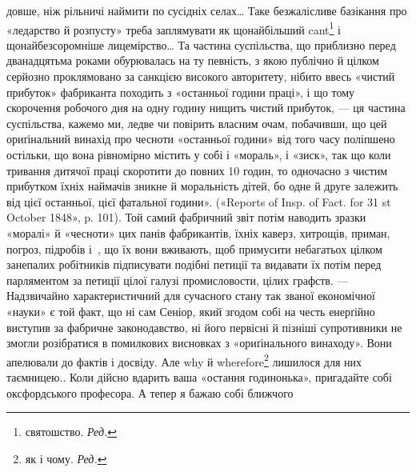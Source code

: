 {{довше, ніж рільничі наймити по сусідніх селах\dots{} Таке безжалісливе базікання
про «ледарство й розпусту» треба заплямувати як щонайбільший cant\footnote*{
святошство. \emph{Ред.}
}} і щонайбезсоромніше
лицемірство\dots{} Та частина суспільства, що приблизно перед дванадцятьма роками обурювалась на ту
певність, з якою публічно й цілком серйозно проклямовано за санкцією високого авторитету, нібито
ввесь «чистий прибуток» фабриканта походить з «останньої години праці», і що тому скорочення
робочого дня на одну
годину нищить чистий прибуток, — ця частина суспільства, кажемо ми,
ледве чи повірить власним очам, побачивши, що цей ориґінальний винахід
про чесноти «останньої години» від того часу поліпшено остільки, що вона
рівномірно містить у собі і «мораль», і «зиск», так що коли тривання дитячої праці скоротити до
повних 10 годин, то одночасно з чистим прибутком їхніх наймачів зникне й моральність дітей, бо одне
й друге залежить від цієї останньої, цієї фатальної години». («Reports of Insp. of Fact. for 31 st
October 1848», p. 101). Той самий фабричний звіт потім наводить
зразки «моралі» й «чесноти» цих панів фабрикантів, їхніх каверз, хитрощів,
приман, погроз, підробів і~, що їх вони вживають, щоб примусити небагатьох цілком занепалих
робітників підписувати подібні петиції та видавати їх потім перед парляментом за петиції цілої
галузі промисловости, цілих графств. — Надзвичайно характеристичний для сучасного стану так званої
економічної «науки» є той факт, що ні сам Сеніор, який згодом собі на честь енерґійно виступив за
фабричне законодавство, ні його первісні
й пізніші супротивники не змогли розібратися в помилкових висновках з «ориґінального винаходу». Вони
апелювали до фактів і досвіду. Але why й wherefore\footnote*{
як і чому. \emph{Ред.}
} лишилося для них таємницею.}.
Коли дійсно вдарить ваша «остання годинонька», пригадайте собі оксфордського професора. А тепер я
бажаю собі ближчого
\parbreak{}  %
